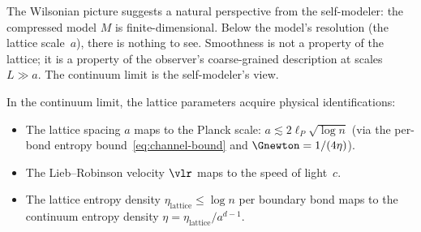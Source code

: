 The Wilsonian picture suggests a natural perspective from the
self-modeler:  the compressed model $M$ is finite-dimensional.  Below
the model's resolution (the lattice scale~$a$), there is nothing to
see.  Smoothness is not a property of the lattice; it is a property of
the observer's coarse-grained description at scales $L \gg a$.  The
continuum limit is the self-modeler's view.

In the continuum limit, the lattice parameters acquire physical
identifications:
\begin{itemize}
\item The lattice spacing $a$ maps to the Planck scale:
  $a \lesssim 2\ell_P \sqrt{\log n}$ (via the per-bond entropy
  bound~\eqref{eq:channel-bound} and
  $\Gnewton = 1/(4\eta)$).
\item The Lieb--Robinson velocity $\vlr$ maps to the speed of
  light~$c$.
\item The lattice entropy density
  $\eta_{\mathrm{lattice}} \leq \log n$ per boundary bond maps to
  the continuum entropy density
  $\eta = \eta_{\mathrm{lattice}}/a^{d-1}$.
\end{itemize}
